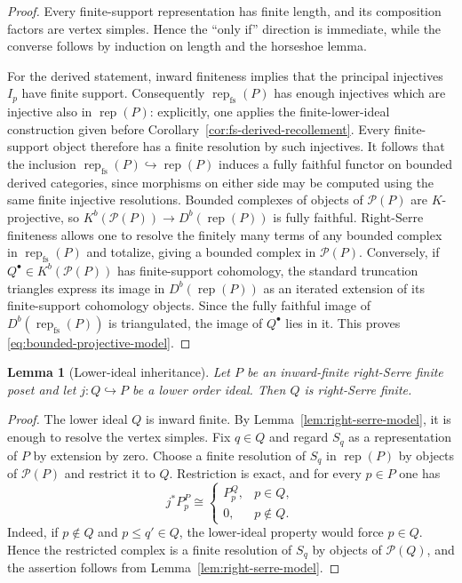 \documentclass[12pt,reqno]{amsart}
\newtheorem{lemma}[theorem]{Lemma}
\theoremstyle{definition}
\theoremstyle{remark}
\newcommand{\Rep}{\operatorname{rep}}
\begin{document}
\begin{proof}
Every finite-support representation has finite length, and its composition
factors are vertex simples.  Hence the ``only if'' direction is immediate,
while the converse follows by induction on length and the horseshoe lemma.

For the derived statement, inward finiteness implies that the principal
injectives $I_p$ have finite support.  Consequently
$\Rep_{\mathrm{fs}}(P)$ has enough injectives which are injective also in
$\Rep(P)$: explicitly, one applies the finite-lower-ideal construction given
before Corollary~\ref{cor:fs-derived-recollement}.  Every finite-support object
therefore has a finite resolution by such injectives.  It follows that the
inclusion
$\Rep_{\mathrm{fs}}(P)\hookrightarrow\Rep(P)$ induces a fully faithful
functor on bounded derived categories, since morphisms on either side may be
computed using the same finite injective resolutions.  Bounded complexes of objects of
$\mathcal P(P)$ are $K$-projective, so
$K^b(\mathcal P(P))\to D^b(\Rep(P))$ is fully faithful.  Right-Serre
finiteness allows one to resolve the finitely many terms of any bounded
complex in $\Rep_{\mathrm{fs}}(P)$ and totalize, giving a bounded complex in
$\mathcal P(P)$.  Conversely, if $Q^\bullet\in K^b(\mathcal P(P))$ has
finite-support cohomology, the standard truncation triangles express its
image in $D^b(\Rep(P))$ as an iterated extension of its finite-support
cohomology objects.  Since the fully faithful image of
$D^b(\Rep_{\mathrm{fs}}(P))$ is triangulated, the image of $Q^\bullet$ lies
in it.  This proves \eqref{eq:bounded-projective-model}.
\end{proof}

\begin{lemma}[Lower-ideal inheritance]
\label{lem:right-serre-lower-ideal}
Let $P$ be an inward-finite right-Serre finite poset and let
$j:Q\hookrightarrow P$ be a lower order ideal.  Then $Q$ is right-Serre
finite.
\end{lemma}

\begin{proof}
The lower ideal $Q$ is inward finite.  By
Lemma~\ref{lem:right-serre-model}, it is enough to resolve the vertex simples.
Fix $q\in Q$ and regard $S_q$ as a representation of $P$ by extension by
zero.  Choose a finite resolution of $S_q$ in $\Rep(P)$ by objects of
$\mathcal P(P)$ and restrict it to $Q$.  Restriction is exact, and for every
$p\in P$ one has
\[
j^*P_p^P\cong
\begin{cases}
P_p^Q,&p\in Q,\\
0,&p\notin Q.
\end{cases}
\]
Indeed, if $p\notin Q$ and $p\le q'\in Q$, the lower-ideal property would
force $p\in Q$.  Hence the restricted complex is a finite resolution of
$S_q$ by objects of $\mathcal P(Q)$, and the assertion follows from
Lemma~\ref{lem:right-serre-model}.
\end{proof}
\end{document}

